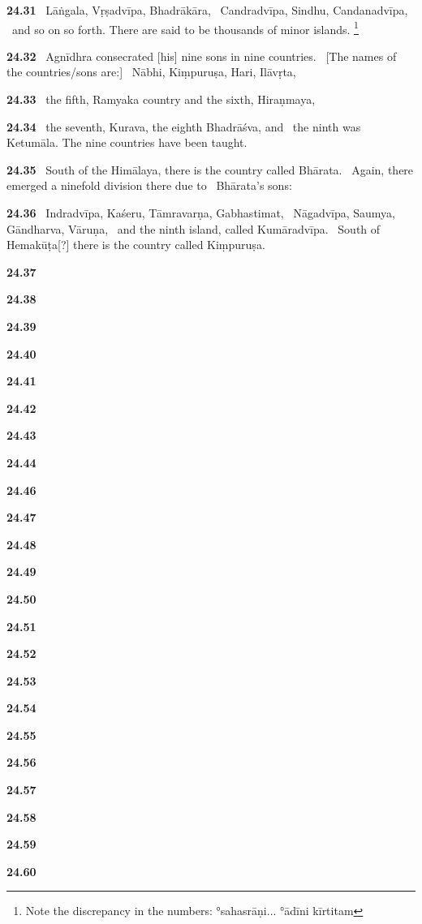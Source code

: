 \documentclass{article}
\begin{document}
\textbf{24.31}%
\ Lāṅgala, Vṛṣadvīpa, Bhadrākāra,%
\ Candradvīpa, Sindhu, Candanadvīpa,%
\ and so on so forth. There are said to be thousands of minor islands.%
\footnote{Note the discrepancy in the numbers: °sahasrāṇi... °ādīni kīrtitam  }%


\textbf{24.32}%
\ Agnīdhra consecrated [his] nine sons in nine countries.%
\ [The names of the countries/sons are:]%
\              Nābhi, Kiṃpuruṣa, Hari, Ilāvṛta,%


\textbf{24.33}%
\ the fifth, Ramyaka country and the sixth, Hiraṇmaya,%


\textbf{24.34}%
\ the seventh, Kurava, the eighth Bhadrāśva, and%
\                 the ninth was Ketumāla. The nine countries have been taught.%


\textbf{24.35}%
\ South of the Himālaya, there is the country called Bhārata.%
\                Again, there emerged a ninefold division there due to%
\                Bhārata's sons:%


\textbf{24.36}%
\ Indradvīpa, Kaśeru, Tāmravarṇa, Gabhastimat,%
\              Nāgadvīpa, Saumya, Gāndharva, Vāruṇa,%
\ and the ninth island, called Kumāradvīpa.%
\             South of Hemakūṭa[?] there is the country called Kiṃpuruṣa.%


\textbf{24.37}%


\textbf{24.38}%


\textbf{24.39}%


\textbf{24.40}%


\textbf{24.41}%


\textbf{24.42}%


\textbf{24.43}%


\textbf{24.44}%


\textbf{24.46}%


\textbf{24.47}%


\textbf{24.48}%


\textbf{24.49}%


\textbf{24.50}%


\textbf{24.51}%


\textbf{24.52}%


\textbf{24.53}%


\textbf{24.54}%


\textbf{24.55}%


\textbf{24.56}%


\textbf{24.57}%


\textbf{24.58}%


\textbf{24.59}%


\textbf{24.60}%
\end{document}
